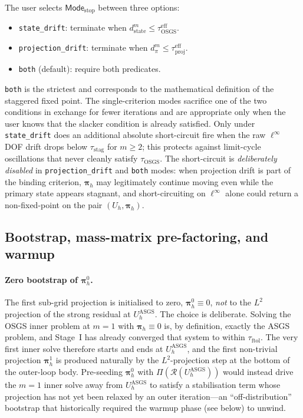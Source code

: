 \documentclass{article}
\newcommand{\code}[1]{\texttt{\small #1}}
\newcommand{\textftol}{\tau_{\mathrm{ftol}}}
\newcommand{\textstag}{\tau_{\mathrm{stag}}}
\begin{document}
The user selects $\mathsf{Mode}_{\mathrm{stop}}$ between three options:
\begin{itemize}
\item \code{state\_drift}: terminate when $d_{\mathrm{state}}^m \le \tau_{\mathrm{OSGS}}^{\mathrm{eff}}$.
\item \code{projection\_drift}: terminate when $d_\pi^m \le \tau_{\mathrm{proj}}^{\mathrm{eff}}$.
\item \code{both} (default): require both predicates.
\end{itemize}
\code{both} is the strictest and corresponds to the mathematical
definition of the staggered fixed point. The single-criterion modes
sacrifice one of the two conditions in exchange for fewer iterations
and are appropriate only when the user knows that the slacker
condition is already satisfied. Only under \code{state\_drift} does
an additional absolute short-circuit fire when the raw $\ell^\infty$
DOF drift drops below $\textstag$ for $m \ge 2$; this protects against
limit-cycle oscillations that never cleanly satisfy
$\tau_{\mathrm{OSGS}}$. The short-circuit is \emph{deliberately
disabled} in \code{projection\_drift} and \code{both} modes: when
projection drift is part of the binding criterion, $\boldsymbol{\pi}_h$
may legitimately continue moving even while the primary state appears
stagnant, and short-circuiting on $\ell^\infty$ alone could return a
non-fixed-point on the pair $(U_h, \boldsymbol{\pi}_h)$.

\subsection{Bootstrap, mass-matrix pre-factoring, and warmup}
\label{sec:osgs-bootstrap}

\paragraph{Zero bootstrap of $\boldsymbol{\pi}_h^0$.}  The first sub-grid
projection is initialised to zero, $\boldsymbol{\pi}_h^0 \equiv 0$,
\emph{not} to the $L^2$ projection of the strong residual at
$U_h^{\mathrm{ASGS}}$. The choice is deliberate. Solving the OSGS
inner problem at $m = 1$ with $\boldsymbol{\pi}_h \equiv 0$ is, by
definition, exactly the ASGS problem, and Stage~I has already converged
that system to within $\textftol$. The very first inner solve therefore
starts and ends at $U_h^{\mathrm{ASGS}}$, and the first non-trivial
projection $\boldsymbol{\pi}_h^1$ is produced naturally by the
$L^2$-projection step at the bottom of the outer-loop body. Pre-seeding
$\boldsymbol{\pi}_h^0$ with $\Pi(\mathcal{R}(U_h^{\mathrm{ASGS}}))$
would instead drive the $m = 1$ inner solve away from $U_h^{\mathrm{ASGS}}$
to satisfy a stabilisation term whose projection has not yet been
relaxed by an outer iteration---an ``off-distribution'' bootstrap that
historically required the warmup phase (see below) to unwind.
\end{document}
